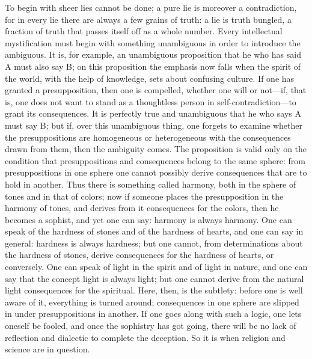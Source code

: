 \documentclass[12pt]{book}
\newcommand{\opage}[1]{\marginnote{\footnotesize\textit{[#1]}}}
\begin{document}
To begin with sheer lies cannot be done; a pure lie is moreover a
contradiction, for in every lie there are always a few grains of truth:
a lie is truth bungled, a fraction of truth that passes itself off as a
whole number. Every intellectual mystification must begin with something
unambiguous in order to introduce the ambiguous. It is, for example, an
unambiguous proposition that he who has said A must also say B; on this
proposition the emphasis now falls when the spirit of the world, with
the help of knowledge, sets about confusing culture. If one has granted
a presupposition, then one is compelled, whether one will or not---if,
that is, one does not want to stand as a thoughtless person in
self-contradiction---to grant its consequences. It is perfectly true and
unambiguous that he who says A must say B; but if, over this unambiguous
thing, one forgets to examine whether the presuppositions are homogeneous
or heterogeneous with the consequences drawn from them, then the
ambiguity comes. The proposition is valid only on the condition that
presuppositions
\opage{59}\setcounter{footnote}{0}%
and consequences belong to the same sphere: from presuppositions in one
sphere one cannot possibly derive consequences that are to hold in
another. Thus there is something called harmony, both in the sphere of
tones and in that of colors; now if someone places the presupposition in
the harmony of tones, and derives from it consequences for the colors,
then he becomes a sophist, and yet one can say: harmony is always
harmony. One can speak of the hardness of stones and of the hardness of
hearts, and one can say in general: hardness is always hardness; but one
cannot, from determinations about the hardness of stones,
derive consequences for the hardness of hearts, or conversely. One can
speak of light in the spirit and of light in nature, and one can say
that the concept light is always light; but one cannot derive from the
natural light consequences for the spiritual. Here, then, is the
subtlety: before one is well aware of it, everything is turned around;
consequences in one sphere are slipped in under presuppositions in
another. If one goes along with such a logic, one lets oneself be
fooled, and once the sophistry has got going, there will be no lack of
reflection and dialectic to complete the deception. So it is when
religion and science are in question.
\end{document}
